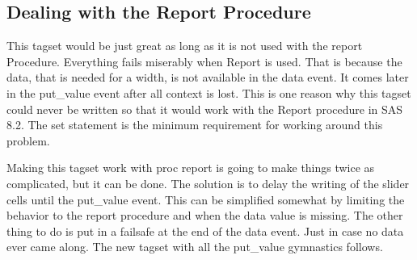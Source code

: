 
\subsection{Dealing with the Report Procedure}
This tagset would be just great as long as it is not used with the report Procedure.  Everything
fails miserably when Report is used.  That is because the data, that is needed for a width, is
not available in the data event.  It comes later in the put\_value event after all context 
is lost.  This is one reason why this tagset could never be written so that it would work 
with the Report procedure in SAS 8.2.  The set statement is the minimum requirement for
working around this problem.

Making this tagset work with proc report is going to make things twice as complicated, but it
can be done.  The solution is to delay the writing of the slider cells until the put\_value event.
This can be simplified somewhat by limiting the behavior to the report procedure and when the
data value is missing.  The other thing to do is put in a failsafe at the end of the data event.
Just in case no data ever came along.  The new tagset with all the put\_value gymnastics follows.

